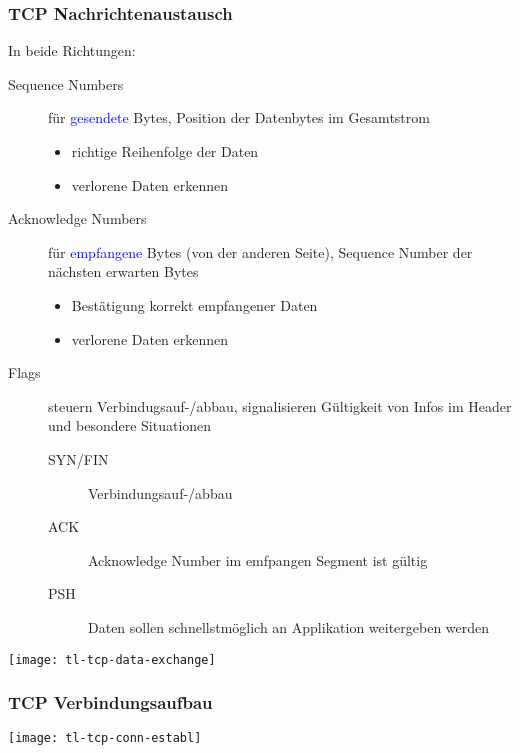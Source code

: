 \subsubsection{TCP Nachrichtenaustausch}
In beide Richtungen:
\begin{description}
    \item[Sequence Numbers] für \textcolor{blue}{gesendete} Bytes,
        Position der Datenbytes im Gesamtstrom
        \begin{itemize}
            \item richtige Reihenfolge der Daten
            \item verlorene Daten erkennen
        \end{itemize}
    \item[Acknowledge Numbers] für \textcolor{blue}{empfangene} Bytes
        (von der anderen Seite), Sequence Number der nächsten erwarten Bytes
        \begin{itemize}
            \item Bestätigung korrekt empfangener Daten
            \item verlorene Daten erkennen
        \end{itemize}
    \item[Flags] steuern Verbindugsauf-/abbau, signalisieren Gültigkeit von Infos
        im Header und besondere Situationen
        \begin{description}
            \item[SYN/FIN] Verbindungsauf-/abbau
            \item[ACK] Acknowledge Number im emfpangen Segment ist gültig
            \item[PSH] Daten sollen schnellstmöglich an Applikation weitergeben werden
        \end{description}
\end{description}

\begin{center}
    \texttt{[image: tl-tcp-data-exchange]}
\end{center}

\subsubsection{TCP Verbindungsaufbau}

\begin{center}
    \texttt{[image: tl-tcp-conn-establ]}
\end{center}


